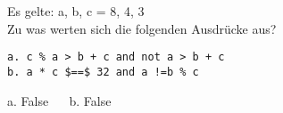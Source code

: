 \question[2]
Es gelte: a, b, c = 8, 4, 3\\
Zu was werten sich die folgenden Ausdrücke aus?
\begin{lstlisting}
a. c % a > b + c and not a > b + c
b. a * c $==$ 32 and a !=b % c
\end{lstlisting}

\begin{solutionbox}{1cm}
a. False ~~ b. False
\end{solutionbox}

